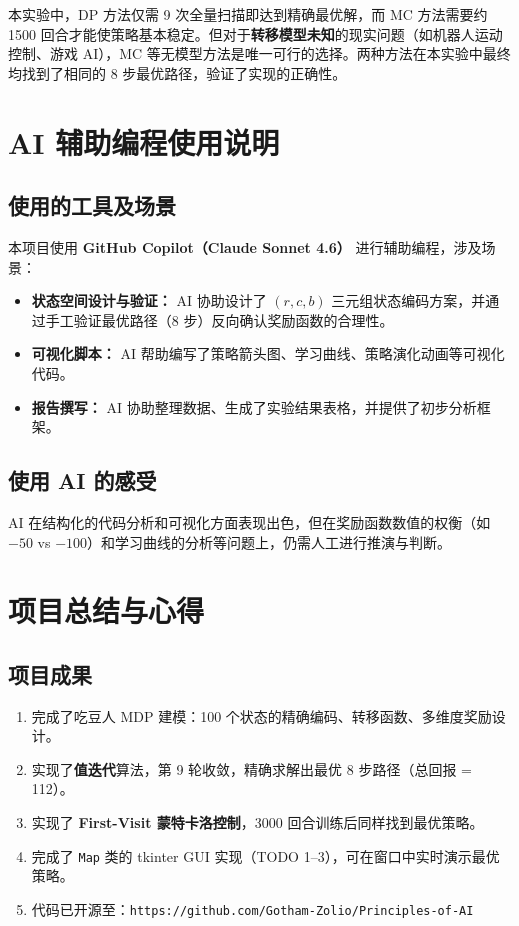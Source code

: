 \documentclass[12pt,a4paper]{ctexart}
\begin{document}
本实验中，DP 方法仅需 9 次全量扫描即达到精确最优解，而 MC 方法需要约 1500 回合才能使策略基本稳定。但对于\textbf{转移模型未知}的现实问题（如机器人运动控制、游戏 AI），MC 等无模型方法是唯一可行的选择。两种方法在本实验中最终均找到了相同的 8 步最优路径，验证了实现的正确性。

\section{AI 辅助编程使用说明}

\subsection{使用的工具及场景}
本项目使用 \textbf{GitHub Copilot（Claude Sonnet 4.6）} 进行辅助编程，涉及场景：
\begin{itemize}
    \item \textbf{状态空间设计与验证：} AI 协助设计了 $(r, c, b)$ 三元组状态编码方案，并通过手工验证最优路径（8 步）反向确认奖励函数的合理性。
    \item \textbf{可视化脚本：} AI 帮助编写了策略箭头图、学习曲线、策略演化动画等可视化代码。
    \item \textbf{报告撰写：} AI 协助整理数据、生成了实验结果表格，并提供了初步分析框架。
\end{itemize}

\subsection{使用 AI 的感受}
AI 在结构化的代码分析和可视化方面表现出色，但在奖励函数数值的权衡（如 $-50$ vs $-100$）和学习曲线的分析等问题上，仍需人工进行推演与判断。

\section{项目总结与心得}

\subsection{项目成果}
\begin{enumerate}
    \item 完成了吃豆人 MDP 建模：100 个状态的精确编码、转移函数、多维度奖励设计。
    \item 实现了\textbf{值迭代}算法，第 9 轮收敛，精确求解出最优 8 步路径（总回报 = 112）。
    \item 实现了 \textbf{First-Visit 蒙特卡洛控制}，3000 回合训练后同样找到最优策略。
    \item 完成了 \texttt{Map} 类的 tkinter GUI 实现（TODO 1--3），可在窗口中实时演示最优策略。
    \item 代码已开源至：\texttt{https://github.com/Gotham-Zolio/Principles-of-AI}
\end{enumerate}
\end{document}
